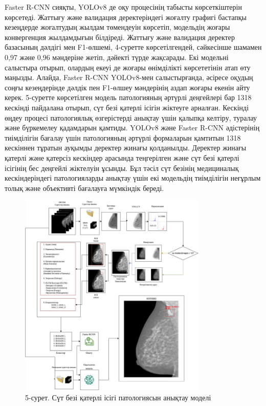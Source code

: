 \begin{multicols}{2}
Faster R-CNN сияқты, YOLOv8 де оқу процесінің табысты көрсеткіштерін
көрсетеді. Жаттығу және валидация деректеріндегі жоғалту графигі
бастапқы кезеңдерде жоғалтудың жылдам төмендеуін көрсетіп, модельдің
жоғары конвергенция жылдамдығын білдіреді. Жаттығу және валидация
деректер базасының дәлдігі мен F1-өлшемі, 4-суретте көрсетілгендей,
сәйкесінше шамамен 0,97 және 0,96 мәндеріне жетіп, дәйекті түрде
жақсарады. Екі модельні салыстыра отырып, олардың екеуі де жоғары
өнімділікті көрсететінін атап өту маңызды. Алайда, Faster R-CNN
YOLOv8-мен салыстырғанда, әсіресе оқудың соңғы кезеңдерінде дәлдік пен
F1-өлшеу мәндерінің аздап жоғары екенін айту керек. 5-суретте
көрсетілген модель патологияның әртүрлі деңгейлері бар 1318 кескінді
пайдалана отырып, сүт безі қатерлі ісігін жіктеуге арналған. Кескінді
өңдеу процесі патологиялық өзгерістерді анықтау үшін қалыпқа келтіру,
туралау және бүркемелеу қадамдарын қамтиды. YOLOv8 және Faster R-CNN
әдістерінің тиімділігін бағалау үшін патологияның әртүрлі формаларын
қамтитын 1318 кескіннен тұратын ауқымды деректер жинағы қолданылды.
Деректер жинағы қатерлі және қатерсіз кескіндер арасында теңгерілген
және сүт безі қатерлі ісігінің бес деңгейлі жіктелуін ұсынды. Бұл тәсіл
сүт безінің медициналық кескіндеріндегі патологияларды анықтау үшін екі
модельдің тиімділігін неғұрлым толық және объективті бағалауға мүмкіндік
береді.
\end{multicols}

\begin{figure}[H]
	\centering
	\includegraphics[width=0.8\textwidth]{media/ict/image27}
	\caption*{5-сурет. Сүт безі қатерлі ісігі патологиясын анықтау моделі}
\end{figure}

